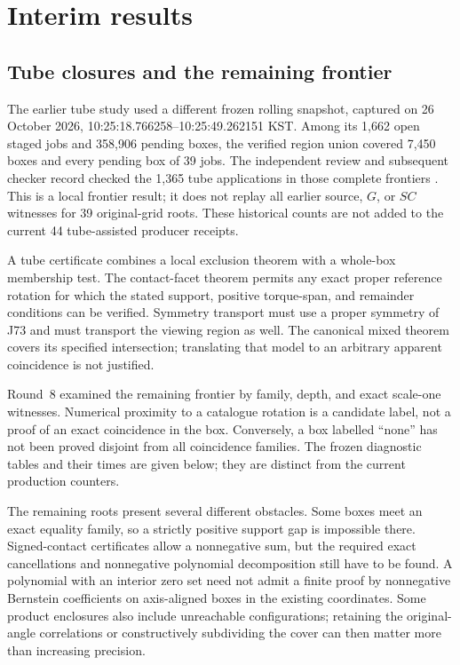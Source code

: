 \documentclass[11pt]{amsart}
\theoremstyle{definition}
\theoremstyle{remark}
\begin{document}
\section{Interim results}\label{sec:interim}



\subsection{Tube closures and the remaining frontier}
The earlier tube study used a different frozen rolling snapshot, captured
on 26 October 2026, 10:25:18.766258--10:25:49.262151 KST. Among its
1,662 open staged jobs and 358,906 pending boxes, the verified region
union covered 7,450 boxes and every pending box of 39 jobs. The
independent review and subsequent checker record checked the 1,365 tube
applications in those complete frontiers \cite{tubefrontier}. This is a
local frontier result; it does not replay all earlier source, $G$, or
$SC$ witnesses for 39 original-grid roots. These historical counts are
not added to the current 44 tube-assisted producer receipts.

A tube certificate combines a local exclusion theorem with a whole-box
membership test. The contact-facet theorem permits any exact proper
reference rotation for which the stated support, positive torque-span,
and remainder conditions can be verified. Symmetry transport must use a
proper symmetry of J73 and must transport the viewing region as well.
The canonical mixed theorem covers its specified intersection; translating
that model to an arbitrary apparent coincidence is not justified.

Round~8 examined the remaining frontier by family, depth, and exact
scale-one witnesses. Numerical proximity to a catalogue rotation is a
candidate label, not a proof of an exact coincidence in the box. Conversely,
a box labelled ``none'' has not been proved disjoint from all coincidence
families. The frozen diagnostic tables and their times are given below;
they are distinct from the current production counters.



The remaining roots present several different obstacles. Some boxes meet
an exact equality family, so a strictly positive support gap is impossible
there. Signed-contact certificates allow a nonnegative sum, but the
required exact cancellations and nonnegative polynomial decomposition
still have to be found. A polynomial with an interior zero set need not
admit a finite proof by nonnegative Bernstein coefficients on axis-aligned
boxes in the existing coordinates. Some product enclosures also include
unreachable configurations; retaining the original-angle correlations or
constructively subdividing the cover can then matter more than increasing
precision.
\end{document}
